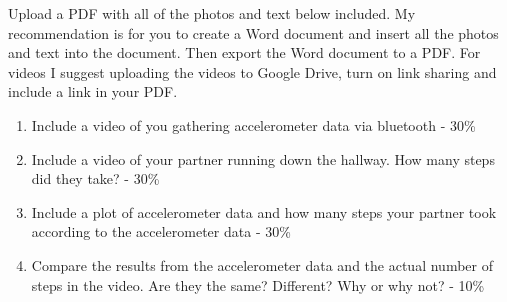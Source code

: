 Upload a PDF with all of the photos and text below included. My recommendation is for you to create a Word document and insert all the photos and text into the document. Then export the Word document to a PDF. For videos I suggest uploading the videos to Google Drive, turn on link sharing and include a link in your PDF.

\begin{enumerate}[itemsep=-5pt]
\item Include a video of you gathering accelerometer data via bluetooth - 30\%
\item Include a video of your partner running down the hallway. How many steps did they take? - 30\%
\item Include a plot of accelerometer data and how many steps your partner took according to the accelerometer data - 30\%
\item Compare the results from the accelerometer data and the actual number of steps in the video. Are they the same? Different? Why or why not? - 10\%
\end{enumerate}

